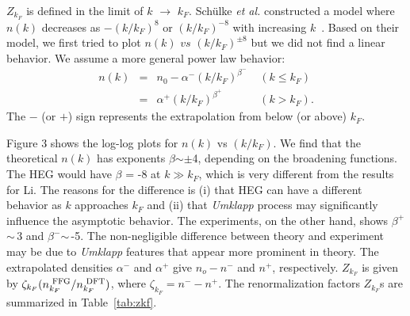 \documentclass[twocolumn,showpacs,showkeys,fleqn,prl,superscriptaddress]{revtex4}%
\newcommand{\nn}[1]{\textnormal{ #1}}
\newcommand{\ii}[1]{\textit{#1}}
\begin{document}
$Z_{k_F}$ is defined in the limit of $k$ $\to$ $k_F$.
Sch{\"u}lke \ii{et al.}\,\,constructed a model where $n(k)$ decreases as $-(k/k_F)^{8}$ or $(k/k_F)^{-8}$ with increasing $k$~\cite{schulke96}.
Based on their model, we first tried to plot $n(k)$ $vs$ $(k/k_F)^{\pm 8}$ but we did not find a linear behavior.
We assume a more general power law behavior:
\begin{eqnarray}
n(k) &=& n_0 - \alpha^{-}  (k/k_F)^{\beta^-}  \;\;\;\; (k \leq k_F)  \nonumber \\
&=&  \alpha^{+}  (k/k_F)^{\beta^+}  \;\;\;\;\;\;\;\;\;\;\;\; (k>k_F).
\end{eqnarray}
The $-$ (or $+$) sign represents the extrapolation from below (or above) $k_F$.

Figure 3 shows the log-log plots for $n(k)$ vs $(k/k_F)$. %
We find that the theoretical $n(k)$ has  exponents $\beta$$\sim\pm$4, depending on the broadening functions.
The HEG  would have $\beta$ = -8 at $k \gg k_F$, which is very different from the results for Li.
The reasons for the difference is (i) that HEG can have a different behavior as $k$ approaches $k_F$ and (ii) that {\it Umklapp} process may significantly influence the asymptotic behavior.
The experiments, on the other hand, shows $\beta^+$$\sim\,$3 and $\beta^-$$\sim\,$-5.
The non-negligible difference between theory and experiment may be due to {\it Umklapp} features that appear more prominent in theory.
The extrapolated densities $\alpha^-$ and $\alpha^+$ give $n_o - n^-$ and $n^+$, respectively.
$Z_{k_F}$ is given by $\zeta_{k_F} (n_{k_F}^{\nn{FFG}}/n_{k_F}^{\nn{DFT}})$, where $\zeta_{k_F}= n^- - n^+$.
The renormalization factors $Z_{k_F}$s are summarized in %
Table~\ref{tab:zkf}.
\end{document}

